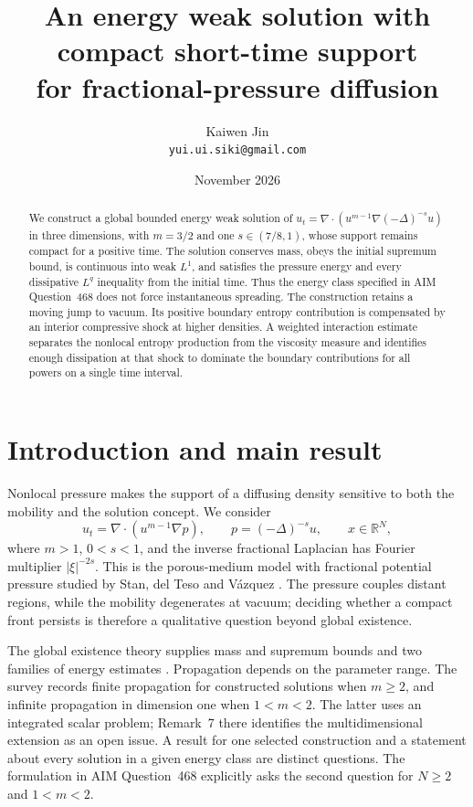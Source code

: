 \documentclass[11pt]{article}
\title{An energy weak solution with compact short-time support\protect\\
 for fractional-pressure diffusion}
\author{Kaiwen Jin\\\small\texttt{yui.ui.siki@gmail.com}}
\date{November 2026}
\newcommand{\R}{\mathbb R}
\theoremstyle{definition}
\numberwithin{equation}{section}
\begin{document}
\maketitle
\begin{abstract}
We construct a global bounded energy weak solution of
$u_t=\nabla\cdot(u^{m-1}\nabla(-\Delta)^{-s}u)$ in three dimensions,
with $m=3/2$ and one $s\in(7/8,1)$, whose support remains compact for a
positive time. The solution conserves mass, obeys the initial supremum
bound, is continuous into weak $L^1$, and satisfies the pressure energy
and every dissipative $L^q$ inequality from the initial time. Thus the
energy class specified in AIM Question~468 does not force instantaneous
spreading. The construction retains a moving jump to vacuum. Its positive
boundary entropy contribution is compensated by an interior compressive
shock at higher densities.
A weighted interaction estimate separates the nonlocal entropy production
from the viscosity measure and identifies enough dissipation at that shock
to dominate the boundary contributions for all powers on a single time interval.
\end{abstract}

\section{Introduction and main result}\label{sec:intro}

Nonlocal pressure makes the support of a diffusing density sensitive to
both the mobility and the solution concept. We consider
\begin{equation}\label{eq:model}
 u_t=\nabla\cdot(u^{m-1}\nabla p),\qquad
 p=(-\Delta)^{-s}u,\qquad x\in\R^N,
\end{equation}
where $m>1$, $0<s<1$, and the inverse fractional Laplacian has Fourier
multiplier $|\xi|^{-2s}$. This is the porous-medium model with fractional
potential pressure studied by Stan, del Teso and V\'azquez
\cite{Stan2015,Stan2016,Stan2018}. The pressure couples distant regions,
while the mobility degenerates at vacuum; deciding whether a compact
front persists is therefore a qualitative question beyond global existence.

The global existence theory supplies mass and supremum bounds and two
families of energy estimates \cite[Theorem~2.2]{Stan2016}. Propagation
depends on the parameter range. The survey \cite[Theorems~5.3--5.4]{Stan2018}
records finite propagation for constructed solutions when $m\geq2$, and
infinite propagation in dimension one when $1<m<2$. The latter uses an
integrated scalar problem; Remark~7 there identifies the multidimensional
extension as an open issue. A result for one selected construction and a
statement about every solution in a given energy class are distinct
questions. The formulation in AIM Question~468 \cite{AIM468} explicitly
asks the second question for $N\geq2$ and $1<m<2$.
\end{document}
